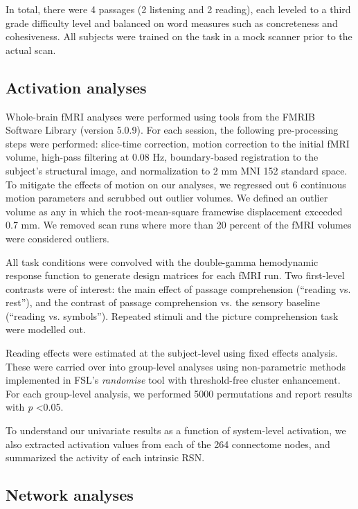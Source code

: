 In total, there were 4 passages (2 listening and 2 reading), each leveled to a third grade difficulty level and balanced on word measures such as concreteness and cohesiveness.  All subjects were trained on the task in a mock scanner prior to the actual scan. 


\subsection{Activation analyses}

Whole-brain fMRI analyses were performed using tools from the FMRIB Software Library (version 5.0.9). For each session, the following pre-processing steps were performed:  slice-time correction, motion correction to the initial fMRI volume, high-pass filtering at 0.08 Hz, boundary-based registration to the subject's structural image, and normalization to 2 mm MNI 152 standard space. To mitigate the effects of motion on our analyses, we regressed out 6 continuous motion parameters and scrubbed out outlier volumes. We defined an outlier volume as any in which the root-mean-square framewise displacement exceeded 0.7 mm. We removed scan runs where more than 20 percent of the fMRI volumes were considered outliers.

All task conditions were convolved with the double-gamma hemodynamic response function to generate design matrices for each fMRI run. Two first-level contrasts were of interest: the main effect of passage comprehension (``reading vs. rest''), and the contrast of passage comprehension vs. the sensory baseline (``reading vs. symbols''). Repeated stimuli and the picture comprehension task were modelled out.

Reading effects were estimated at the subject-level using fixed effects analysis. These were carried over into group-level analyses using non-parametric methods implemented in FSL’s \textit{randomise} tool with threshold-free cluster enhancement. For each group-level analysis, we performed 5000 permutations and report results with \textit{p} \textless 0.05. 

To understand our univariate results as a function of system-level activation, we also extracted activation values from each of the 264 connectome nodes, and summarized the activity of each intrinsic RSN.

\subsection{Network analyses}

